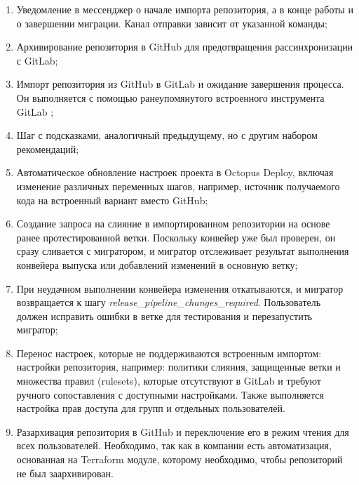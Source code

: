 \begin{enumerate}
  \item Уведомление в мессенджер о начале импорта репозитория, а в конце работы и о завершении миграции. Канал отправки зависит от указанной команды;
  \item Архивирование репозитория в GitHub для предотвращения рассинхронизации с GitLab;
  \item Импорт репозитория из GitHub в GitLab и ожидание завершения процесса. Он выполняется с помощью ранеупомянутого встроенного инструмента GitLab ;
  \item Шаг с подсказками, аналогичный предыдущему, но с другим набором рекомендаций;
  \item Автоматическое обновление настроек проекта в Octopus Deploy, включая изменение различных переменных шагов, например, источник получаемого кода на встроенный вариант вместо GitHub;
  \item Создание запроса на слияние в импортированном репозитории на основе ранее протестированной ветки. Поскольку конвейер уже был проверен, он сразу сливается с мигратором, и мигратор отслеживает результат выполнения конвейера выпуска или добавлений изменений в основную ветку;
  \item При неудачном выполнении конвейера изменения откатываются, и мигратор возвращается к шагу \emph{release\_pipeline\_changes\_required}. Пользователь должен исправить ошибки в ветке для тестирования и перезапустить мигратор;
  \item Перенос настроек, которые не поддерживаются встроенным импортом: настройки репозитория, например: политики слияния, защищенные ветки и множества правил (rulesets), которые отсутствуют в GitLab и требуют ручного сопоставления с доступными настройками. Также выполняется настройка прав доступа для групп и отдельных пользователей.
  \item Разархивация репозитория в GitHub и переключение его в режим чтения для всех пользователей. Необходимо, так как в компании есть автоматизация, основанная на Terraform модуле, которому необходимо, чтобы репозиторий не был заархивирован.
\end{enumerate}
